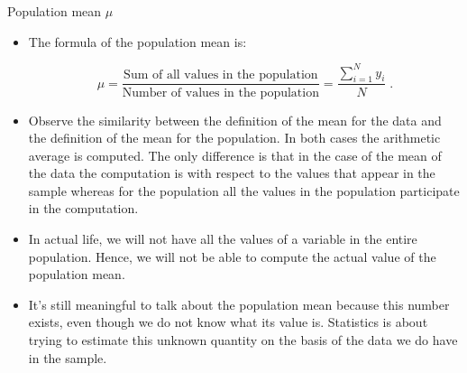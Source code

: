 \documentclass[10pt,handout]{beamer}\usepackage[]{graphicx}\usepackage[]{color}
\begin{document}
\begin{frame}{Population mean $\mu$}
	
	\begin{itemize}[<+->]
		
		\item The formula of the population mean is:
		
		$$\mu = \frac{\mbox{Sum of all values in the population}}{\mbox{Number of values in the population}}= \frac{\sum_{i=1}^N y_i}{N}\;.$$
		
		
		\item Observe the similarity between the definition of the mean for the data
		and the definition of the mean for the population. In both cases the
		arithmetic average is computed. The only difference is that in the case
		of the mean of the data the computation is with respect to the values
		that appear in the sample whereas for the population all the values in
		the population participate in the computation.
		
		\item In actual life, we will not have all the values of a variable in the
		entire population. Hence, we will not be able to compute the actual
		value of the population mean. 
		
		\item It's still meaningful to talk about the population mean because this number exists, even though we do
		not know what its value is. Statistics is about trying to estimate this unknown quantity on the basis of the data we do have in the sample.
		
	\end{itemize}
	
\end{frame}
\end{document}
